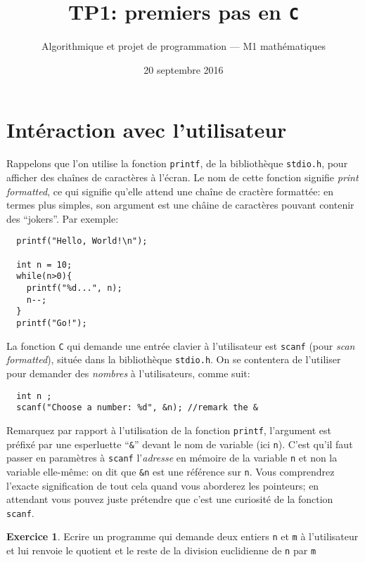\documentclass[10pt,french,a4paper]{article}
\title{\sffamily TP1: premiers pas en {\tt C}}
\date{20 septembre 2016}
\author{Algorithmique et projet de programmation --- M1 mathématiques}
\theoremstyle{definition}
\newtheorem{exercise}{Exercice}
\theoremstyle{remark}
\newcommand{\inlinec}[1]{\lstinline[style=C]|#1|}
\begin{document}
\maketitle

\section{Intéraction avec l'utilisateur}
\label{sec:user-io}

Rappelons que l'on utilise la fonction \inlinec{printf}, de la
bibliothèque \inlinec{stdio.h}, pour afficher des chaînes de caractères
à l'écran. Le nom de cette fonction signifie {\em print formatted}, ce
qui signifie qu'elle attend une chaîne de cractère formattée: en
termes plus simples, son argument est une châine de caractères pouvant
contenir des ``jokers''. Par exemple:
\begin{lstlisting}
  printf("Hello, World!\n");

  int n = 10;
  while(n>0){
    printf("%d...", n);
    n--;
  }
  printf("Go!");
\end{lstlisting}

La fonction {\tt C} qui demande une entrée clavier à l'utilisateur est
\inlinec{scanf} (pour {\em scan formatted}), située dans la bibliothèque \inlinec{stdio.h}. On se
contentera de l'utiliser pour demander des {\em nombres} à
l'utilisateurs, comme suit:
\begin{lstlisting}
  int n ;
  scanf("Choose a number: %d", &n); //remark the &
\end{lstlisting}
Remarquez par rapport à l'utilisation de la fonction \inlinec{printf},
l'argument est préfixé par une esperluette ``\inlinec{&}'' devant le
nom de variable (ici \inlinec{n}). C'est qu'il faut passer en
paramètres à \inlinec{scanf} l'{\em adresse} en mémoire de la variable
\inlinec n et non la variable elle-même: on dit que \inlinec{&n} est
une référence sur \inlinec n. Vous comprendrez l'exacte signification
de tout cela quand vous aborderez les pointeurs; en attendant vous
pouvez juste prétendre que c'est une curiosité de la fonction
\inlinec{scanf}.

\begin{exercise}
  Ecrire un programme qui demande deux entiers \inlinec{n} et
  \inlinec{m} à l'utilisateur et lui renvoie le quotient et le reste
  de la division euclidienne de \inlinec{n} par \inlinec{m}
\end{exercise}
\end{document}
